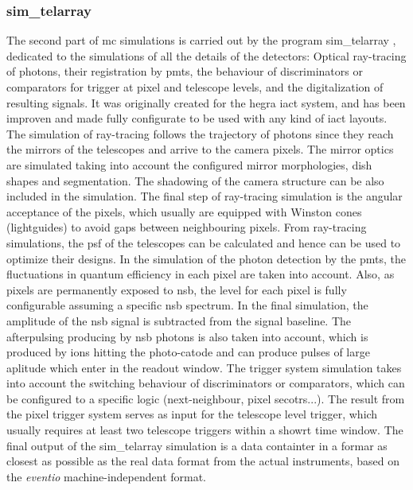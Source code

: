 \documentclass[main.tex]{subfiles}
\begin{document}
\subsubsection{sim\_telarray}

The second part of \gls{mc} simulations is carried out by the program sim\_telarray \cite{2008corsikanadsimtelarray}, dedicated to the simulations of all the details of the detectors: Optical ray-tracing of photons, their registration by \glspl{pmt}, the behaviour of discriminators or comparators for trigger at pixel and telescope levels, and the digitalization of resulting signals. It was originally created for the \gls{hegra} \gls{iact} system, and has been improven and made fully configurate to be used with any kind of \gls{iact} layouts.\\
The simulation of ray-tracing follows the trajectory of photons since they reach the mirrors of the telescopes and arrive to the camera pixels. The mirror optics are simulated taking into account the configured mirror morphologies, dish shapes and segmentation. The shadowing of the camera structure can be also included in the simulation. The final step of ray-tracing simulation is the angular acceptance of the pixels, which usually are equipped with Winston cones (lightguides) to avoid gaps between neighbouring pixels. From ray-tracing simulations, the \gls{psf} of the telescopes can be calculated and hence can be used to optimize their designs. In the simulation of the photon detection by the \glspl{pmt}, the fluctuations in quantum efficiency in each pixel are taken into account.  Also, as pixels are permanently exposed to \gls{nsb}, the level for each pixel is fully configurable assuming a specific \gls{nsb} spectrum. In the final simulation, the amplitude of the \gls{nsb} signal is subtracted from the signal baseline. The afterpulsing producing by \gls{nsb} photons is also taken into account, which is produced by ions hitting the photo-catode and can produce pulses of large aplitude which enter in the readout window. The trigger system simulation takes into account the switching behaviour of discriminators or comparators, which can be configured to a specific logic (next-neighbour, pixel secotrs...). The result from the pixel trigger system serves as input for the telescope level trigger, which usually requires at least two telescope triggers within a showrt time window. The final output of the sim\_telarray simulation is a data containter in a formar as closest as possible as the real data format from the actual instruments, based on the \textit{eventio} machine-independent format.
\end{document}
